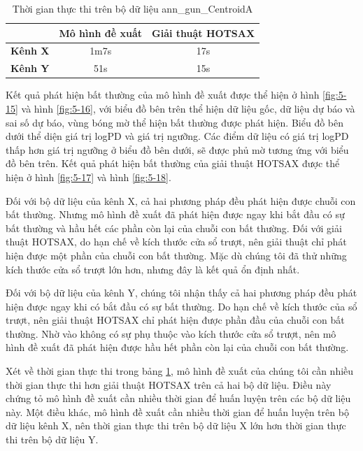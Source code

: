 \begin{table}[H]
\centering
\begin{tabular}{|c|c|c|}
\hline
\textbf { } & \textbf{Mô hình đề xuất} & \textbf{Giải thuật HOTSAX}  \\
\hline
\textbf { Kênh X } & 1m7s                       & 17s                     \\
\hline
\textbf { Kênh Y } & 51s                       & 15s                     \\
\hline
\end{tabular}
\caption{Thời gian thực thi trên bộ dữ liệu ann\_gun\_CentroidA}
\label{tab:5-8}
\end{table}

Kết quả phát hiện bất thường của mô hình đề xuất được thể hiện ở hình \ref{fig:5-15} và hình \ref{fig:5-16}, với biểu đồ bên trên thể hiện dữ liệu gốc, dữ liệu dự báo và sai số dự báo, vùng bóng mờ thể hiện bất thường được phát hiện. Biểu đồ bên dưới thể diện giá trị logPD và giá trị ngưỡng. Các điểm dữ liệu có giá trị logPD thấp hơn giá trị ngưỡng ở biểu đồ bên dưới, sẽ được phủ mờ tương ứng với biểu đồ bên trên. Kết quả phát hiện bất thường của giải thuật HOTSAX được thể hiện ở hình \ref{fig:5-17} và hình \ref{fig:5-18}. 

Đối với bộ dữ liệu của kênh X, cả hai phương pháp đều phát hiện được chuỗi con bất thường. Nhưng mô hình đề xuất đã phát hiện được ngay khi bắt đầu có sự bất thường và hầu hết các phần còn lại của chuỗi con bất thường. Đối với giải thuật HOTSAX, do hạn chế về kích thước cửa sổ trượt, nên giải thuật chỉ phát hiện được một phần của chuỗi con bất thường. Mặc dù chúng tôi đã thử những kích thước cửa sổ trượt lớn hơn, nhưng đây là kết quả ổn định nhất.

Đối với bộ dữ liệu của kênh Y, chúng tôi nhận thấy cả hai phương pháp đều phát hiện được ngay khi có bắt đầu có sự bất thường. Do hạn chế về kích thước của sổ trượt, nên giải thuật HOTSAX chỉ phát hiện được phần đầu của chuỗi con bất thường. Nhờ vào không có sự phụ thuộc vào kích thước cửa sổ trượt, nên mô hình đề xuất đã phát hiện được hầu hết phần còn lại của chuỗi con bất thường.

Xét về thời gian thực thi trong bảng \ref{tab:5-8}, mô hình đề xuất của chúng tôi cần nhiều thời gian thực thi hơn giải thuật HOTSAX trên cả hai bộ dữ liệu. Điều này chứng tỏ mô hình đề xuất cần nhiều thời gian để huấn luyện trên các bộ dữ liệu này. Một điều khác, mô hình đề xuất cần nhiều thời gian để huấn luyện trên bộ dữ liệu kênh X, nên thời gian thực thi trên bộ dữ liệu X lớn hơn thời gian thực thi trên bộ dữ liệu Y. 

